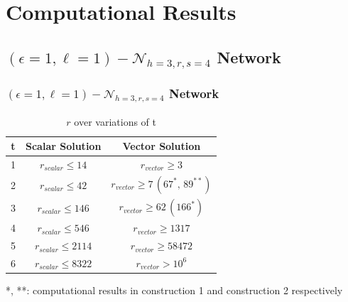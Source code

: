 \documentclass[c]{beamer}
\begin{document}

\section{Computational Results}
\subsection{$\left(\epsilon=1,\ell=1\right)-\mathcal{N}_{h=3,r,s=4}$ Network}
\begin{frame}[c]
\frametitle{$\left(\epsilon=1,\ell=1\right)-\mathcal{N}_{h=3,r,s=4}$ Network}
\begin{table}[H]
\caption{$r$ over variations of t\label{tab:r_over_t}}

\begin{centering}
\begin{tabular}{|c|c|c|}
\hline 
t & Scalar Solution & Vector Solution\tabularnewline
\hline 
\hline 
1 & $r_{scalar}\leq14$ & $r_{vector}\geq3$\tabularnewline
\hline 
2 & $r_{scalar}\leq42$ & $r_{vector}\geq7\,\left(67^{*},\,89^{**}\right)$\tabularnewline
\hline 
3 & $r_{scalar}\leq146$ & $r_{vector}\geq62\,\left(166^{*}\right)$ \tabularnewline
\hline 
4 & $r_{scalar}\leq546$ & $r_{vector}\geq1317$\tabularnewline
\hline 
5 & $r_{scalar}\leq2114$ & $r_{vector}\geq58472$\tabularnewline
\hline 
6 & $r_{scalar}\leq8322$ & $r_{vector}>10^{6}$\tabularnewline
\hline 
\end{tabular}
\par\end{centering}
{*}, {*}{*}: computational results in construction 1 and construction
2 respectively
\end{table}
\end{frame}

\end{document}
